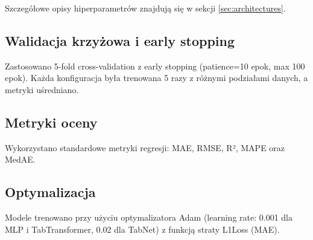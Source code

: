 Szczegółowe opisy hiperparametrów znajdują się w sekcji \ref{sec:architectures}.

\subsection{Walidacja krzyżowa i early stopping}

Zastosowano 5-fold cross-validation z early stopping (patience=10 epok, max 100 epok). Każda konfiguracja była trenowana 5 razy z różnymi podziałami danych, a metryki uśredniano.

\subsection{Metryki oceny}

Wykorzystano standardowe metryki regresji: MAE, RMSE, R², MAPE oraz MedAE.

\subsection{Optymalizacja}

Modele trenowano przy użyciu optymalizatora Adam (learning rate: 0.001 dla MLP i TabTransformer, 0.02 dla TabNet) z funkcją straty L1Loss (MAE).
